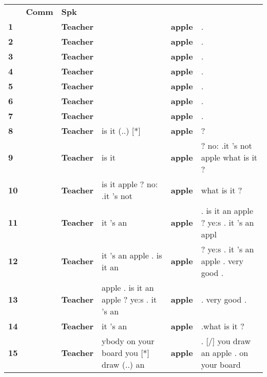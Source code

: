 \documentclass[11pt]{article}
\begin{document}
\begin{flushleft}
\tablefirsthead{}
\tablehead{}
\tabletail{}
\tablelasttail{}
\begin{supertabular}{m{0.16085985in}m{0.34345984in}m{0.42475984in}m{2.2163599in}m{0.26635984in}m{2.0837598in}}
 &
\textbf{Comm} &
\textbf{Spk} &
 &
 &
\\
\raggedleft \textbf{1} &
 &
\textbf{Teacher} &
 &
\centering \textbf{apple} &
.\\
\raggedleft \textbf{2} &
 &
\textbf{Teacher} &
 &
\centering \textbf{apple} &
.\\
\raggedleft \textbf{3} &
 &
\textbf{Teacher} &
 &
\centering \textbf{apple} &
. \\
\raggedleft \textbf{4} &
 &
\textbf{Teacher} &
 &
\centering \textbf{apple} &
. \\
\raggedleft \textbf{5} &
 &
\textbf{Teacher} &
 &
\centering \textbf{apple} &
.\\
\raggedleft \textbf{6} &
 &
\textbf{Teacher} &
 &
\centering \textbf{apple} &
.\\
\raggedleft \textbf{7} &
 &
\textbf{Teacher} &
 &
\centering \textbf{apple} &
. \\
\raggedleft \textbf{8} &
 &
\textbf{Teacher} &
\raggedleft is it (..) [*]  &
\centering \textbf{apple} &
? \\
\raggedleft \textbf{9} &
 &
\textbf{Teacher} &
\raggedleft is it  &
\centering \textbf{apple} &
? no: .it 's not apple what is it ? \\
\raggedleft \textbf{10} &
 &
\textbf{Teacher} &
\raggedleft is it apple ? no: .it 's not  &
\centering \textbf{apple} &
what is it ? \\
\raggedleft \textbf{11} &
 &
\textbf{Teacher} &
\raggedleft it 's an  &
\centering \textbf{apple} &
. is it an apple ? ye:s . it 's an appl\\
\raggedleft \textbf{12} &
 &
\textbf{Teacher} &
\raggedleft it 's an apple . is it an  &
\centering \textbf{apple} &
? ye:s . it 's an apple . very good . \\
\raggedleft \textbf{13} &
 &
\textbf{Teacher} &
\raggedleft apple . is it an apple ? ye:s . it 's an  &
\centering \textbf{apple} &
. very good . \\
\raggedleft \textbf{14} &
 &
\textbf{Teacher} &
\raggedleft it 's an  &
\centering \textbf{apple} &
.what is it ? \\
\raggedleft \textbf{15} &
 &
\textbf{Teacher} &
\raggedleft ybody on your board you [*] draw (..) an  &
\centering \textbf{apple} &
. [/] you draw an apple . on your board\\

\end{supertabular}
\end{flushleft}
\end{document}
